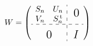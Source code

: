 \documentclass{jarticle}
\begin{document}
$$
W = \left(
\begin{array}{c:c}
\begin{matrix}
S_n & U_n  \\
V_n & S_n^\mathrm{\,t}
\end{matrix} & \text{\Large{\:0}} \\
\hdashline %
 \text{\rule{0pt}{17pt}\Large{0}}  &  \textit{\Large{I}}
\end{array}
\right)
$$
\end{document}
